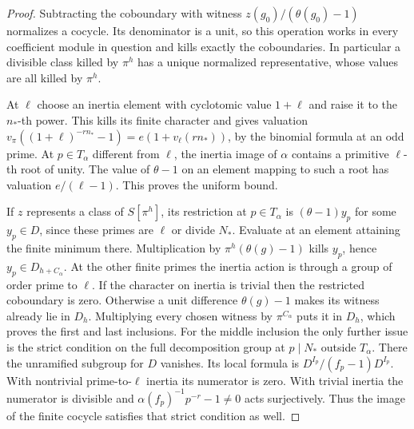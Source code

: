 \documentclass[a4paper,11pt]{article}
\theoremstyle{definition}
\theoremstyle{remark}
\numberwithin{equation}{section}
\begin{document}
\begin{proof}
Subtracting the coboundary with witness
\(z(g_0)/(\theta(g_0)-1)\) normalizes a cocycle. Its
denominator is a unit, so this operation works in every
coefficient module in question and kills exactly the
coboundaries. In particular a divisible class killed by
\(\pi^h\) has a unique normalized representative, whose
values are all killed by \(\pi^h\).

At \(\ell\) choose an inertia element with cyclotomic value
\(1+\ell\) and raise it to the \(n_*\)-th power. This kills
its finite character and gives valuation
\(v_\pi((1+\ell)^{-rn_*}-1)=e(1+v_\ell(rn_*))\), by the
binomial formula at an odd prime. At \(p\in T_\alpha\)
different from \(\ell\), the inertia image of \(\alpha\)
contains a primitive \(\ell\)-th root of unity. The value
of \(\theta-1\) on an element mapping to such a root has
valuation \(e/(\ell-1)\). This proves the uniform bound.

If \(z\) represents a class of \(S[\pi^h]\), its restriction
at \(p\in T_\alpha\) is \((\theta-1)y_p\) for some \(y_p\in D\),
since these primes are \(\ell\) or divide \(N_*\). Evaluate at
an element attaining the finite minimum there. Multiplication
by \(\pi^h(\theta(g)-1)\) kills \(y_p\), hence
\(y_p\in D_{h+C_\alpha}\). At the other finite primes the
inertia action is through a group of order prime to \(\ell\).
If the character on inertia is trivial then the restricted
coboundary is zero. Otherwise a unit difference \(\theta(g)-1\)
makes its witness already lie in \(D_h\). Multiplying every
chosen witness by \(\pi^{C_\alpha}\) puts it in \(D_h\), which
proves the first and last inclusions. For the middle inclusion
the only further issue is the strict condition on the full
decomposition group at \(p\mid N_*\) outside \(T_\alpha\).
There the unramified subgroup for \(D\) vanishes. Its local
formula is \(D^{I_p}/(f_p-1)D^{I_p}\). With nontrivial
prime-to-\(\ell\) inertia its numerator is zero. With trivial
inertia the numerator is divisible and
\(\alpha(f_p)^{-1}p^{-r}-1\ne0\) acts surjectively.
Thus the image of the finite cocycle satisfies that strict
condition as well.
\end{proof}
\end{document}
